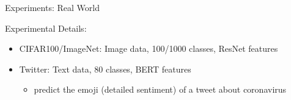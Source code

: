 \begin{frame}{Experiments: Real World}

\resizebox{\columnwidth}{!}{

}

    \vspace{0.2in}
Experimental Details:

\begin{itemize}
    \item CIFAR100/ImageNet: Image data, 100/1000 classes, ResNet features
        
        \citep{He2016DeepRL}

    \item Twitter: Text data, 80 classes, BERT features
        
        \citep{stoikos2020multilingual}

        \begin{itemize}
            \item predict the emoji (detailed sentiment) of a tweet about coronavirus
        \end{itemize}
\end{itemize}

\end{frame}

